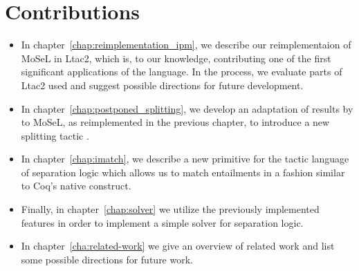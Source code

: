 \section{Contributions}
\label{sec:contributions}

\begin{itemize}
\item In chapter~\ref{chap:reimplementation_ipm}, we describe our reimplementaion of MoSeL in Ltac2, which is, to our knowledge, contributing one of the first significant applications of the language.
  In the process, we evaluate parts of Ltac2 used and suggest possible directions for future development.
\item In chapter~\ref{chap:postponed_splitting}, we develop an adaptation of results by \citet{harlandResourceDistributionBooleanConstraints2003} to MoSeL, as reimplemented in the previous chapter, to introduce a new splitting tactic .
\item In chapter~\ref{chap:imatch}, we describe a new primitive  for the tactic language of separation logic which allows us to match entailments in a fashion similar to Coq's native  construct.
\item Finally, in chapter~\ref{chap:solver} we utilize the previously implemented features in order to implement a simple solver for separation logic.
\item In chapter~\ref{cha:related-work} we give an overview of related work and list some possible directions for future work.
\end{itemize}


